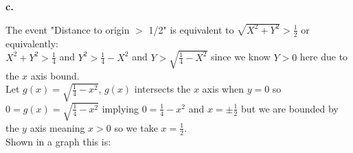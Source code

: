 \documentclass{article}
\begin{document}
\newpage
{\Large\textbf{c.}}
\begin{center}
\doublespacing
    The event "Distance to origin $>$ 1/2" is equivalent to $\sqrt{X^2 + Y^2} >\frac{1}{2}$ or equivalently:
    \\$X^2 + Y^2 >\frac{1}{4}$ and $Y^2 >\frac{1}{4} - X^2$ and $Y >\sqrt{\frac{1}{4} - X^2}$ since we know $Y > 0$ here due to the $x$ axis bound.
    \\Let $g(x) =\sqrt{\frac{1}{4} - x^2}$, $g(x)$ intersects the $x$ axis when $y = 0$ so $0 = g(x) =\sqrt{\frac{1}{4} - x^2}$ implying $0 =\frac{1}{4} - x^2$ and $x =\pm\frac{1}{2}$ but we are bounded by the $y$ axis meaning $x > 0$ so we take $x =\frac{1}{2}$.
    \\Shown in a graph this is:
    \break\break
\end{center}
\end{document}
